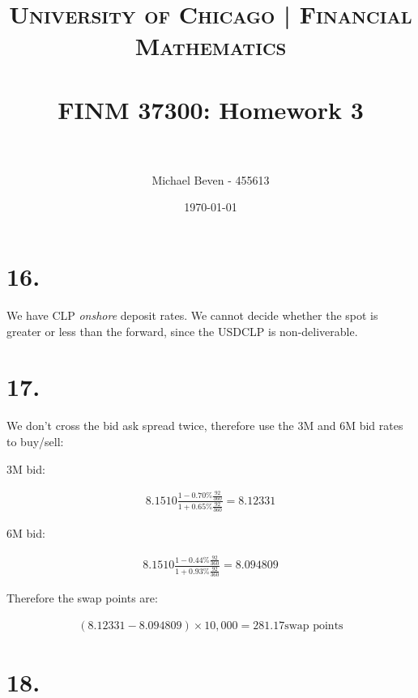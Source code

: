 \documentclass[paper=a4, fontsize=11pt]{scrartcl} %
\title{	
\normalfont \normalsize 
\textsc{University of Chicago | Financial Mathematics} \\ [25pt] %
\horrule{0.5pt} \\[0.4cm] %
\huge FINM 37300: Homework 3 \\ %
\horrule{2pt} \\[0.5cm] %
}
\author{Michael Beven - 455613} %
\date{\normalsize\today} %
\numberwithin{equation}{section} %
\numberwithin{figure}{section} %
\numberwithin{table}{section} %
\begin{document}
\maketitle %


\section*{16.}

We have CLP \textit{onshore} deposit rates.  We cannot decide whether the spot is greater or less than the forward, since the USDCLP is non-deliverable.  


\section*{17.}

We don't cross the bid ask spread twice, therefore use the 3M and 6M bid rates to buy/sell:

3M bid:

\begin{align*}
8.1510 \frac{1-0.70\% \frac{92}{360}}{1+0.65\% \frac{92}{360}} = 8.12331
\end{align*}

6M bid:

\begin{align*}
8.1510 \frac{1-0.44\% \frac{92}{360}}{1+0.93\% \frac{92}{360}} = 8.094809
\end{align*}

Therefore the swap points are:

\begin{align*}
(8.12331 - 8.094809)\times 10,000 = 281.17 \text{swap points}
\end{align*}


\section*{18.}
\end{document}
